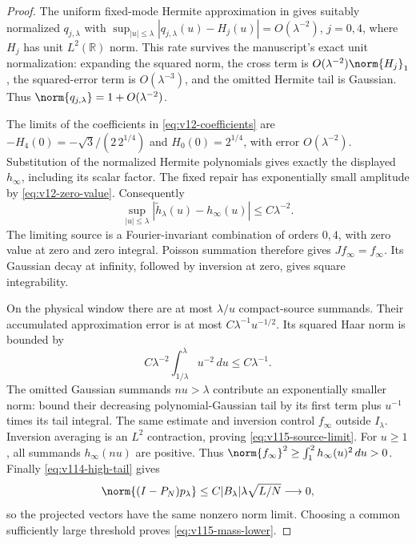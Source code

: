 \begin{proof}
The uniform fixed-mode Hermite approximation in
\cite[Lemma~7.2]{ConnesConsaniMoscovici2025} gives suitably normalized
$q_{j,\lambda}$ with
$\sup_{|u|\le\lambda}|q_{j,\lambda}(u)-H_j(u)|=O(\lambda^{-2})$,
$j=0,4$, where $H_j$ has unit $L^2(\mathbb R)$ norm. This rate survives
the manuscript's exact unit normalization: expanding the squared norm,
the cross term is $O(\lambda^{-2})\norm{H_j}_1$, the squared-error term
is $O(\lambda^{-3})$, and the omitted Hermite tail is Gaussian.
Thus $\norm{q_{j,\lambda}}=1+O(\lambda^{-2})$.

The limits of the coefficients in \eqref{eq:v12-coefficients} are
$-H_4(0)=-\sqrt3/(2\,2^{1/4})$ and $H_0(0)=2^{1/4}$, with error
$O(\lambda^{-2})$. Substitution of the normalized Hermite polynomials
gives exactly the displayed $h_\infty$, including its scalar factor.
The fixed repair has exponentially small amplitude by
\eqref{eq:v12-zero-value}. Consequently
\[
 \sup_{|u|\le\lambda}|\widetilde h_\lambda(u)-h_\infty(u)|
       \le C\lambda^{-2}.
\]
The limiting source is a Fourier-invariant combination of orders $0,4$,
with zero value at zero and zero integral. Poisson summation therefore
gives $Jf_\infty=f_\infty$. Its Gaussian decay at infinity, followed by
inversion at zero, gives square integrability.

On the physical window there are at most $\lambda/u$ compact-source
summands. Their accumulated approximation error is at most
$C\lambda^{-1}u^{-1/2}$. Its squared Haar norm is bounded by
\[
 C\lambda^{-2}\int_{1/\lambda}^\lambda u^{-2}\,du
       \le C\lambda^{-1}.
\]
The omitted Gaussian summands $nu>\lambda$ contribute an exponentially
smaller norm: bound their decreasing polynomial-Gaussian tail by its
first term plus $u^{-1}$ times its tail integral. The same estimate and
inversion control $f_\infty$ outside $I_\lambda$. Inversion averaging
is an $L^2$ contraction, proving \eqref{eq:v115-source-limit}.
For $u\ge1$, all summands $h_\infty(nu)$ are positive. Thus
$\norm{f_\infty}^2\ge\int_1^2h_\infty(u)^2\,du>0$.
Finally \eqref{eq:v114-high-tail} gives
\[
 \norm{(I-P_N)p_\lambda}
       \le C|B_\lambda|\lambda\sqrt{L/N}\longrightarrow0,
\]
so the projected vectors have the same nonzero norm limit. Choosing a
common sufficiently large threshold proves \eqref{eq:v115-mass-lower}.
\end{proof}

